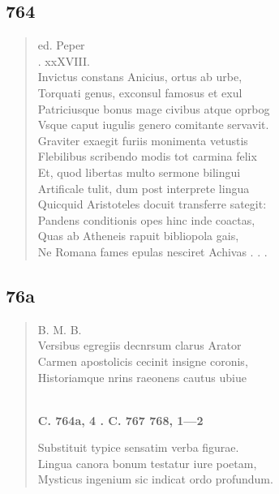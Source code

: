 \documentclass[11pt, a4paper]{report}
\begin{document}
            \subsection*{764}
      \begin{verse}
      ed. Peper \\ . xxXVIII. \\ Invictus constans Anicius, ortus ab urbe, \\ Torquati genus, exconsul famosus et exul \\ Patriciusque bonus mage civibus atque oprbog \\ Vsque caput iugulis genero comitante servavit. \\ Graviter exaegit furiis monimenta vetustis \\ Flebilibus scribendo modis tot carmina felix \\ Et, quod libertas multo sermone bilingui \\ Artificale tulit, dum post interprete lingua \\ Quicquid Aristoteles docuit transferre sategit: \\ Pandens conditionis opes hinc inde coactas, \\ Quas ab Atheneis rapuit bibliopola gais, \\ Ne Romana fames epulas nesciret Achivas . . . \\ 
      \end{verse}
  
            \subsection*{76a}
      \begin{verse}
      B. M. B. \\ Versibus egregiis decnrsum clarus Arator \\ Carmen apostolicis cecinit insigne coronis, \\ Historiamque nrins raeonens cautus ubiue \\ 
        ﻿\pagebreak 
    \begin{center} \textbf{C. 764a, 4 . C. 767 768, 1—2} \end{center} \marginpar{[252]} Substituit typice sensatim verba figurae. \\ Lingua canora bonum testatur iure poetam, \\ Mysticus ingenium sic indicat ordo profundum. \\ 
      \end{verse}
  
\end{document}
